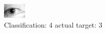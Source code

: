 \begin{figure}[h!]
\begin{center}
\includegraphics[width=0.60\columnwidth]{figures/ID1252_class_4_target_3.png}
\end{center}
\caption{ Classification: 4 actual target: 3}
\label{fig:ID1252_class_4_target_3}
\end{figure}
